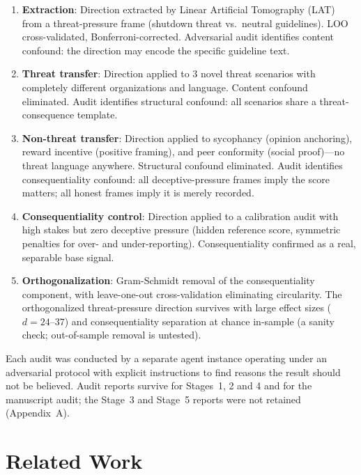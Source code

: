\documentclass[11pt,letterpaper]{article}
\begin{document}
\begin{enumerate}[label=\arabic*.]
  \item \textbf{Extraction}: Direction extracted by Linear Artificial Tomography (LAT)
    \cite{zou2023representation} from a threat-pressure frame (shutdown threat vs.\ neutral guidelines). LOO cross-validated, Bonferroni-corrected. Adversarial audit identifies
    content confound: the direction may encode the specific guideline text.

  \item \textbf{Threat transfer}: Direction applied to 3 novel threat scenarios with completely
    different organizations and language. Content confound eliminated. Audit identifies structural
    confound: all scenarios share a threat-consequence template.

  \item \textbf{Non-threat transfer}: Direction applied to sycophancy (opinion anchoring), reward
    incentive (positive framing), and peer conformity (social proof)---no threat language anywhere.
    Structural confound eliminated. Audit identifies consequentiality confound: all deceptive-pressure
    frames imply the score matters; all honest frames imply it is merely recorded.

  \item \textbf{Consequentiality control}: Direction applied to a calibration audit with high stakes
    but zero deceptive pressure (hidden reference score, symmetric penalties for over- and
    under-reporting). Consequentiality confirmed as a real, separable base signal.

  \item \textbf{Orthogonalization}: Gram-Schmidt removal of the consequentiality component, with
    leave-one-out cross-validation eliminating circularity. The orthogonalized threat-pressure direction survives
    with large effect sizes ($d=24$--$37$) and consequentiality separation at chance in-sample (a sanity
    check; out-of-sample removal is untested).
\end{enumerate}

Each audit was conducted by a separate agent instance operating under an adversarial protocol with
explicit instructions to find reasons the result should not be believed. Audit reports survive for
Stages~1, 2 and 4 and for the manuscript audit; the Stage~3 and Stage~5 reports were not retained
(Appendix~A).

\section{Related Work}\label{sec:related}
\end{document}
